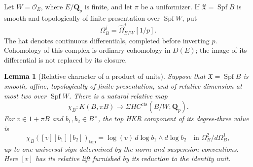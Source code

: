 \documentclass[11pt,a4paper]{article}
\newtheorem{lemma}[theorem]{Lemma}
\theoremstyle{remark}
\begin{document}
Let $W=\mathcal O_E$, where $E/\mathbf Q_p$ is finite, and let $\pi$
be a uniformizer. If $\mathfrak X=\operatorname{Spf}B$ is smooth and
topologically of finite presentation over $\operatorname{Spf}W$, put
\[
 \Omega_B^j=\widehat\Omega^j_{B/W}[1/p].
\]
The hat denotes continuous differentials, completed before inverting
$p$. Cohomology of this complex is ordinary cohomology in $D(E)$;
the image of its differential is not replaced by its closure.

\begin{lemma}[Relative character of a product of units]
\label{lem:relativelogproduct}
Suppose that $\mathfrak X=\operatorname{Spf}B$ is smooth, affine,
topologically of finite presentation, and of relative dimension at
most two over $\operatorname{Spf}W$. There is a natural relative map
\[
 \chi_B:K(B,\pi B)\longrightarrow
                  \Sigma HC^{\mathrm{cts}}(B/W;\mathbf Q_p).
\]
For $v\in1+\pi B$ and $b_1,b_2\in B^\times$, the top HKR component
of its degree-three value is
\begin{equation}\label{eq:tcreviewlogproduct}
 \chi_B([v][b_1][b_2])_{\mathrm{top}}
   =\log(v)\,d\log b_1\wedge d\log b_2
       \quad\text{in }\Omega_B^2/d\Omega_B^1,
\end{equation}
up to one universal sign determined by the norm and suspension
conventions. Here $[v]$ has its relative lift furnished by its reduction
to the identity unit.
\end{lemma}
\end{document}
